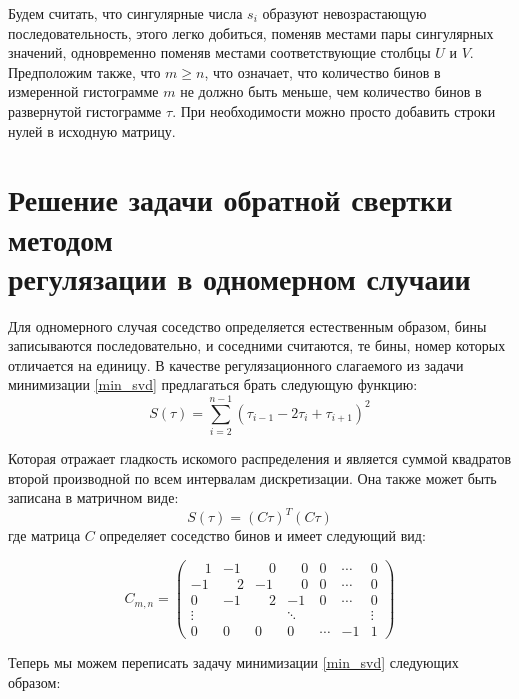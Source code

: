 \documentclass[a4paper,12pt]{diplom}
\renewcommand{\geq}{\geqslant}
\begin{document}
Будем считать, что сингулярные числа $s_{i}$ образуют невозрастающую последовательность, этого легко добиться, поменяв местами пары сингулярных 
значений, одновременно поменяв местами соответствующие столбцы $U$ и $V$. Предположим также, что $m \geq n$, что означает, 
что количество бинов в измеренной гистограмме $m$ не должно быть меньше, чем количество бинов в развернутой гистограмме $\tau$. 
При необходимости можно просто добавить строки нулей в исходную матрицу.




\section[Одномерный случай]{Решение задачи обратной свертки методом \\ регулязации в одномерном случаии}

Для одномерного случая соседство определяется естественным образом, бины записываются последовательно, и соседними считаются, те бины, номер 
которых отличается на единицу. В качестве регулязационного слагаемого из задачи минимизации \eqref{min_svd} предлагаться брать следующую функцию:
\begin{equation}
    S(\tau)= \sum_{i=2}^{n-1} (\tau_{i-1} - 2\tau_{i} + \tau_{i+1})^2
\end{equation}

Которая отражает гладкость искомого распределения и является суммой квадратов второй производной по всем интервалам дискретизации. 
Она также может быть записана в матричном виде:
\begin{equation}
    S(\tau) = (C\tau)^T(C\tau)
\end{equation}
где матрица $C$ определяет соседство бинов и имеет следующий вид:

\begin{equation}
    C_{m,n} = 
 \begin{pmatrix}
   \quad 1 &       -1 &  \quad 0 &  \quad 0 & 0 & \cdots & 0 \\
        -1 &  \quad 2 &       -1 &  \quad 0 & 0 & \cdots & 0 \\
         0 &       -1 & \quad  2 &       -1 & 0 & \cdots & 0 \\
  \vdots &  & & \ddots & & & \vdots \\
  0  & 0  & 0 & 0 & \cdots & -1 & 1
 \end{pmatrix}
 \label{one_dim_neighbors_mat}
\end{equation}

Теперь мы можем переписать задачу минимизации \eqref{min_svd} следующих образом:
\end{document}
